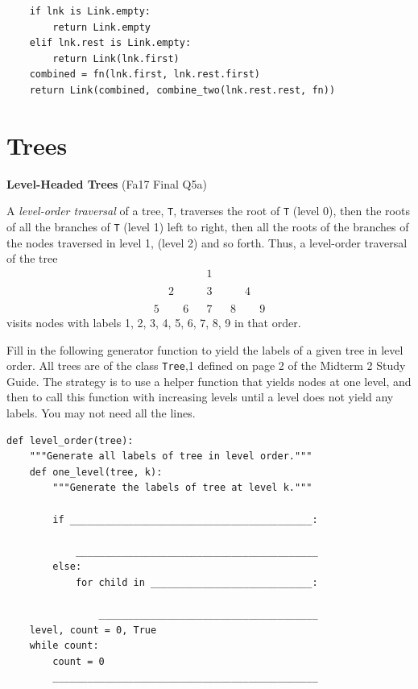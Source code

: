 \documentclass{exam}
\newlength{\currentparskip}
\newenvironment{blocksection}
{
    \setlength{\currentparskip}{\parskip}%
    \begin{minipage}{\linewidth}
    \setlength{\parskip}{\currentparskip}%
}
{
    \end{minipage}
}
\begin{document}
\begin{questions}
\begin{solution}
\begin{lstlisting}
    if lnk is Link.empty:
        return Link.empty
    elif lnk.rest is Link.empty:
        return Link(lnk.first)
    combined = fn(lnk.first, lnk.rest.first)
    return Link(combined, combine_two(lnk.rest.rest, fn))
\end{lstlisting}
\end{solution}
\end{questions}
\section{Trees}
\begin{questions}

\begin{blocksection}
\question \textbf{Level-Headed Trees} (Fa17 Final Q5a)

A \textit{level-order traversal} of a tree, \lstinline{T}, traverses the root of \lstinline{T} (level 0), then the roots of all the branches of \lstinline{T} (level 1)
left to right, then all the roots of the branches of the nodes traversed in level 1, (level 2) and so forth. Thus, a
level-order traversal of the tree
$$ \begin{matrix}
&&&&1&&&&\\ \\
&2&&&3&&&4&\\ \\
5&&6&&7&&8&&9
\end{matrix}
$$
visits nodes with labels 1, 2, 3, 4, 5, 6, 7, 8, 9 in that order.

Fill in the following generator function to yield the labels of a given tree in level order. All trees are
of the class \lstinline{Tree},1 defined on page 2 of the Midterm 2 Study Guide. The strategy is to use a helper function
that yields nodes at one level, and then to call this function with increasing levels until a level does not yield
any labels. You may not need all the lines.
\begin{lstlisting}
def level_order(tree):
    """Generate all labels of tree in level order."""
    def one_level(tree, k):
        """Generate the labels of tree at level k."""
        
        if __________________________________________:

            __________________________________________
        else:
            for child in ____________________________:

                ______________________________________
    level, count = 0, True
    while count:
        count = 0
        ______________________________________________


\end{lstlisting}
\end{blocksection}
\end{questions}
\end{document}
